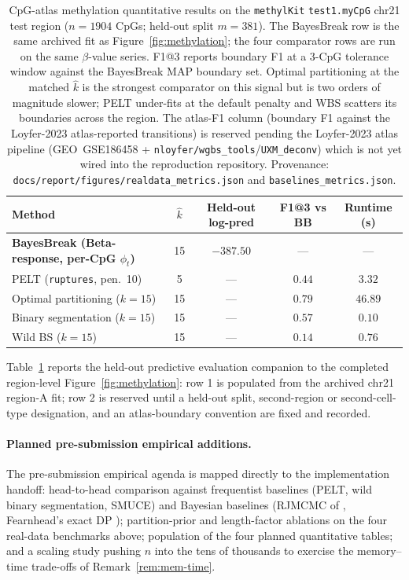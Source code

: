 \begin{table}[H]
    \centering
    \begin{tabular}{@{}lcccc@{}}
    \toprule
    Method & $\widehat k$ & Held-out log-pred & F1@3 vs BB & Runtime (s) \\
    \midrule
    \textbf{BayesBreak (Beta-response, per-CpG $\phi_t$)} & 15 & $-387.50$ & --- & --- \\
    \midrule
    PELT (\texttt{ruptures}, pen.\ 10)                    & 5  & --- & $0.44$ & $3.32$ \\
    Optimal partitioning ($k=15$)                          & 15 & --- & $0.79$ & $46.89$ \\
    Binary segmentation ($k=15$)                           & 15 & --- & $0.57$ & $0.10$ \\
    Wild BS ($k=15$)                                       & 15 & --- & $0.14$ & $0.76$ \\
    \bottomrule
    \end{tabular}
    \caption[CpG-atlas methylation results with external baselines]{CpG-atlas methylation quantitative results on the \texttt{methylKit} \texttt{test1.myCpG} chr21 test region ($n=1904$ CpGs; held-out split $m=381$). The BayesBreak row is the same archived fit as Figure~\ref{fig:methylation}; the four comparator rows are run on the same $\beta$-value series. F1@3 reports boundary F1 at a 3-CpG tolerance window against the BayesBreak MAP boundary set. Optimal partitioning at the matched \(\widehat k\) is the strongest comparator on this signal but is two orders of magnitude slower; PELT under-fits at the default penalty and WBS scatters its boundaries across the region. The atlas-F1 column (boundary F1 against the Loyfer-2023 atlas-reported transitions) is reserved pending the Loyfer-2023 atlas pipeline (GEO~GSE186458 + \texttt{nloyfer/wgbs\_tools}/\texttt{UXM\_deconv}) which is not yet wired into the reproduction repository. Provenance: \texttt{docs/report/figures/realdata\_metrics.json} and \texttt{baselines\_metrics.json}.}
    \label{tab:real_methylation}
\end{table}

Table~\ref{tab:real_methylation} reports the held-out predictive evaluation companion to the completed region-level Figure~\ref{fig:methylation}: row 1 is populated from the archived chr21 region-A fit; row 2 is reserved until a held-out split, second-region or second-cell-type designation, and an atlas-boundary convention are fixed and recorded.

\paragraph{Planned pre-submission empirical additions.}
The pre-submission empirical agenda is mapped directly to the implementation handoff: head-to-head comparison against frequentist baselines
(PELT, wild binary segmentation, SMUCE) and Bayesian baselines (RJMCMC of
\citet{green1995rjMCMC}, Fearnhead's exact DP \citep{fearnhead2006exact}); partition-prior
and length-factor ablations on the four real-data benchmarks above; population of the four planned
quantitative tables; and a scaling study pushing $n$ into the tens of thousands to exercise the memory--time trade-offs of
Remark~\ref{rem:mem-time}.

